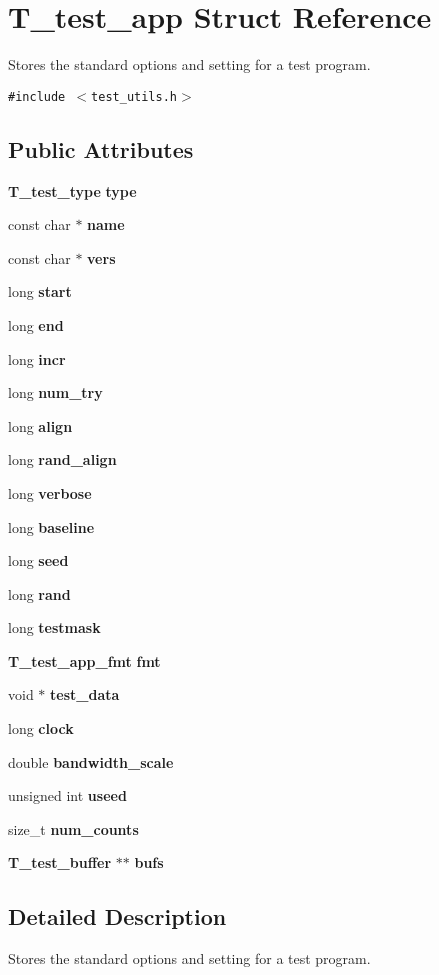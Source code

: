 \section{T\_\-test\_\-app Struct Reference}
\label{structT__test__app}
Stores the standard options and setting for a test program. 


{\tt \#include $<$test\_\-utils.h$>$}

\subsection*{Public Attributes}
\begin{CompactItemize}
\item 
{\bf T\_\-test\_\-type} {\bf type}
\item 
const char $\ast$ {\bf name}
\item 
const char $\ast$ {\bf vers}
\item 
long {\bf start}
\item 
long {\bf end}
\item 
long {\bf incr}
\item 
long {\bf num\_\-try}
\item 
long {\bf align}
\item 
long {\bf rand\_\-align}
\item 
long {\bf verbose}
\item 
long {\bf baseline}
\item 
long {\bf seed}
\item 
long {\bf rand}
\item 
long {\bf testmask}
\item 
{\bf T\_\-test\_\-app\_\-fmt} {\bf fmt}
\item 
void $\ast$ {\bf test\_\-data}
\item 
long {\bf clock}
\item 
double {\bf bandwidth\_\-scale}
\item 
unsigned int {\bf useed}
\item 
size\_\-t {\bf num\_\-counts}
\item 
{\bf T\_\-test\_\-buffer} $\ast$$\ast$ {\bf bufs}
\end{CompactItemize}


\subsection{Detailed Description}
Stores the standard options and setting for a test program.



